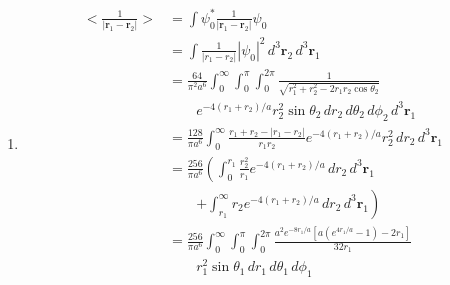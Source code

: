 \documentclass{article}
\renewcommand{\vec}[1]{\boldsymbol{\mathbf{#1}}}
\begin{document}
\subsection{}

\begin{enumerate}
  \item

        \begin{align*}
          \biggl< \frac{1}{|\vec{r}_1 - \vec{r}_2|} \biggr> & = \int \psi_0^* \frac{1}{|\vec{r}_1 - \vec{r}_2|} \psi_0                                                                                                  \\
                                                            & = \int \frac{1}{|r_1 - r_2|} |\psi_0|^2 \,d^3 \vec{r}_2 \,d^3 \vec{r}_1                                                                                   \\
                                                            & = \frac{64}{\pi^2 a^6} \int_0^\infty \int_0^\pi \int_0^{2 \pi} \frac{1}{\sqrt{r_1^2 + r_2^2 - 2 r_1 r_2 \cos \theta_2}}                                   \\
                                                            & \qquad e^{-4 (r_1 + r_2) / a} r_2^2 \sin \theta_2 \,d r_2 \,d \theta_2 \,d \phi_2 \,d^3 \vec{r}_1                                                         \\
                                                            & = \frac{128}{\pi a^6} \int_0^\infty \frac{r_1 + r_2 - |r_1 - r_2|}{r_1 r_2} e^{-4 (r_1 + r_2) / a} r_2^2 \,d r_2 \,d^3 \vec{r}_1                          \\
                                                            & = \frac{256}{\pi a^6} \left( \int_0^{r_1} \frac{r_2^2}{r_1} e^{-4 (r_1 + r_2) / a} \,d r_2 \,d^3 \vec{r}_1 \right.                                        \\
                                                            & \qquad \left. + \int_{r_1}^\infty r_2 e^{-4 (r_1 + r_2) / a} \,d r_2 \,d^3 \vec{r}_1 \right)                                                              \\
                                                            & = \frac{256}{\pi a^6} \int_0^\infty \int_0^\pi \int_0^{2 \pi} \frac{a^2 e^{-8 r_1 / a} \left[ a \left( e^{4 r_1 / a} - 1 \right) - 2 r_1 \right]}{32 r_1} \\
                                                            & \qquad r_1^2 \sin \theta_1 \,d r_1 \,d \theta_1 \,d \phi_1                                                                                                \\

\end{align*}
\end{enumerate}
\end{document}
